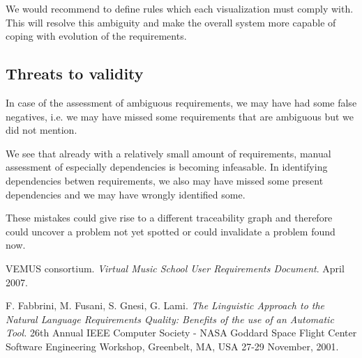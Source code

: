 \documentclass[a4paper,twoside, twocolumn,11pt]{article}
\numberwithin{equation}{section}
\begin{document}
We would recommend to define rules which each visualization must comply with. This will resolve this ambiguity and make the overall system more capable of coping with evolution of the requirements.

\subsection{Threats to validity}
In case of the assessment of ambiguous requirements, we may have had some false negatives, i.e. we may have missed some requirements that are ambiguous but we did not mention.

 We see that already with a relatively small amount of requirements, manual assessment of especially dependencies is becoming infeasable. In identifying dependencies betwen requirements, we also may have missed some present dependencies and we may have wrongly identified some.

These mistakes could give rise to a different traceability graph and therefore could uncover a problem not yet spotted or could invalidate a problem found now. 


\begin{thebibliography}{9}
VEMUS consortium. \emph{Virtual Music School User Requirements Document}.
April 2007.

F. Fabbrini, M. Fusani, S. Gnesi, G. Lami. \emph{The Linguistic Approach to the Natural Language Requirements Quality: Benefits of the use of an Automatic Tool.} 26th Annual IEEE Computer Society - NASA Goddard Space Flight Center Software Engineering Workshop, Greenbelt, MA, USA 27-29 November, 2001.
\end{thebibliography}
\end{document}
